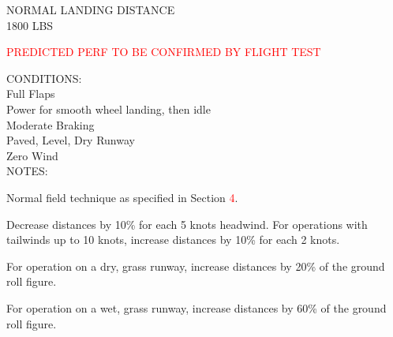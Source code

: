 \begin{sidewaysfigure}[t]
\begin{center}
\begin{perfhdr}NORMAL LANDING DISTANCE\\
1800 LBS
\end{perfhdr}
\Large
\textcolor{red}{PREDICTED PERF TO BE CONFIRMED BY FLIGHT TEST}\normalsize \vspace{5ex}\\

\begin{minipage}{9in}
  \begin{flushleft}
    CONDITIONS:\\
    Full Flaps\\
    Power for smooth wheel landing, then idle\\
    Moderate Braking\\
    Paved, Level, Dry Runway\\
    Zero Wind\\

    NOTES:
    \begin{enumerate*}
      \item Normal field technique as specified in Section \textcolor{red}{4}.
      \item Decrease distances by 10\% for each 5 knots headwind.  For operations with tailwinds up to 10 knots, increase distances by 10\% for each 2 knots.
      \item For operation on a dry, grass runway, increase distances by 20\% of the ground roll figure.
      \item For operation on a wet, grass runway, increase distances by 60\% of the ground roll figure.
      \end{enumerate*}
    \end{flushleft}
\end{minipage}\\

\vspace{\perfnoteskip}


\end{center}
\end{sidewaysfigure}
